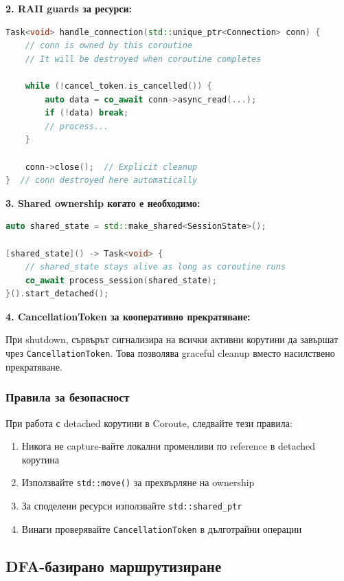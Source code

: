 \textbf{2. RAII guards за ресурси:}
\begin{lstlisting}[language=C++, basicstyle=\small\ttfamily, caption={RAII pattern за connection lifecycle}]
Task<void> handle_connection(std::unique_ptr<Connection> conn) {
    // conn is owned by this coroutine
    // It will be destroyed when coroutine completes
    
    while (!cancel_token.is_cancelled()) {
        auto data = co_await conn->async_read(...);
        if (!data) break;
        // process...
    }
    
    conn->close();  // Explicit cleanup
}  // conn destroyed here automatically
\end{lstlisting}

\textbf{3. Shared ownership когато е необходимо:}
\begin{lstlisting}[language=C++, basicstyle=\small\ttfamily, caption={Shared ownership за споделени ресурси}]
auto shared_state = std::make_shared<SessionState>();

[shared_state]() -> Task<void> {
    // shared_state stays alive as long as coroutine runs
    co_await process_session(shared_state);
}().start_detached();
\end{lstlisting}

\textbf{4. CancellationToken за кооперативно прекратяване:}

При shutdown, сървърът сигнализира на всички активни корутини да завършат чрез \texttt{CancellationToken}. Това позволява graceful cleanup вместо насилствено прекратяване.

\subsubsection{Правила за безопасност}

При работа с detached корутини в Coroute, следвайте тези правила:
\begin{enumerate}
    \item Никога не capture-вайте локални променливи по reference в detached корутина
    \item Използвайте \texttt{std::move()} за прехвърляне на ownership
    \item За споделени ресурси използвайте \texttt{std::shared\_ptr}
    \item Винаги проверявайте \texttt{CancellationToken} в дълготрайни операции
\end{enumerate}

\subsection{DFA-базирано маршрутизиране}

